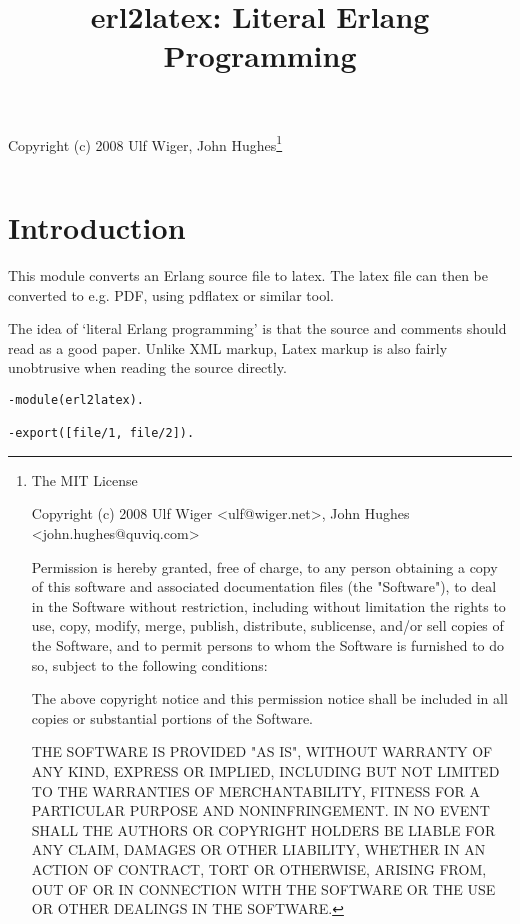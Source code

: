 \documentclass[a4paper,12pt]{article}
\newenvironment{mylisting}
{\begin{list}{}{\setlength{\leftmargin}{1em}}\item\scriptsize\bfseries}
{\end{list}}
\begin{document}
\title{erl2latex: Literal Erlang Programming}
\maketitle

Copyright (c) 2008 Ulf Wiger, John Hughes\footnote{
\tiny{The MIT License

Copyright (c) 2008 Ulf Wiger <ulf@wiger.net>,
John Hughes <john.hughes@quviq.com>

Permission is hereby granted, free of charge, to any person obtaining a
copy of this software and associated documentation files (the "Software"),
to deal in the Software without restriction, including without limitation
the rights to use, copy, modify, merge, publish, distribute, sublicense,
and/or sell copies of the Software, and to permit persons to whom the
Software is furnished to do so, subject to the following conditions:

The above copyright notice and this permission notice shall be included in
all copies or substantial portions of the Software.

THE SOFTWARE IS PROVIDED "AS IS", WITHOUT WARRANTY OF ANY KIND, EXPRESS OR
IMPLIED, INCLUDING BUT NOT LIMITED TO THE WARRANTIES OF MERCHANTABILITY,
FITNESS FOR A PARTICULAR PURPOSE AND NONINFRINGEMENT. IN NO EVENT SHALL
THE AUTHORS OR COPYRIGHT HOLDERS BE LIABLE FOR ANY CLAIM, DAMAGES OR OTHER
LIABILITY, WHETHER IN AN ACTION OF CONTRACT, TORT OR OTHERWISE, ARISING 
FROM, OUT OF OR IN CONNECTION WITH THE SOFTWARE OR THE USE OR OTHER
DEALINGS IN THE SOFTWARE.
}}

\begin{mylisting}
\begin{verbatim}

\end{verbatim}
\end{mylisting}

\section{Introduction}
This module converts an Erlang source file to latex. The latex file
can then be converted to e.g. PDF, using pdflatex or similar tool.

The idea of `literal Erlang programming' is that the source and comments
should read as a good paper. Unlike XML markup, Latex markup is also 
fairly unobtrusive when reading the source directly.


\begin{mylisting}
\begin{verbatim}
-module(erl2latex).

-export([file/1, file/2]).

\end{verbatim}
\end{mylisting}
\end{document}
